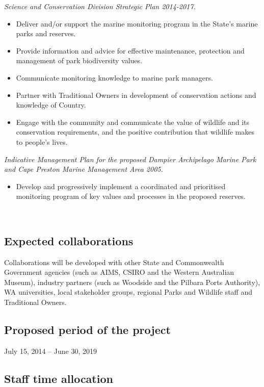 \documentclass[version=last,
    paper=a4, %
    10pt, %
    usenames,
    dvipsnames,
    twoside, %
    headings=openany, %
    BCOR=7mm, %
    DIV=15, %
    toc=chapterentrywithdots %
]{scrbook}
\begin{document}
\emph{Science and Conservation Division Strategic Plan 2014-2017.}

\begin{itemize}
\itemsep1pt\parskip0pt
\item
  Deliver and/or support the marine monitoring program in the State's
  marine parks and reserves.
\item
  Provide information and advice for effective maintenance, protection
  and management of park biodiversity values.
\item
  Communicate monitoring knowledge to marine park managers.
\item
  Partner with Traditional Owners in development of conservation actions
  and knowledge of Country.
\item
  Engage with the community and communicate the value of wildlife and
  its conservation requirements, and the positive contribution that
  wildlife makes to people's lives.
\end{itemize}

\emph{Indicative Management Plan for the proposed Dampier Archipelago
Marine Park and Cape Preston Marine Management Area 2005.}

\begin{itemize}
\itemsep1pt\parskip0pt
\item
  Develop and progressively implement a coordinated and prioritised
  monitoring program of key values and processes in the proposed
  reserves.
\end{itemize}

~



\subsection*{Expected collaborations}
Collaborations will be developed with other State and Commonwealth
Government agencies (such as AIMS, CSIRO and the Western Australian
Museum), industry partners (such as Woodside and the Pilbara Ports
Authority), WA universities, local stakeholder groups, regional Parks
and Wildlife staff and Traditional Owners.


\subsection*{Proposed period of the project}
July 15, 2014 -- June 30, 2019

\subsection*{Staff time allocation }
\end{document}
